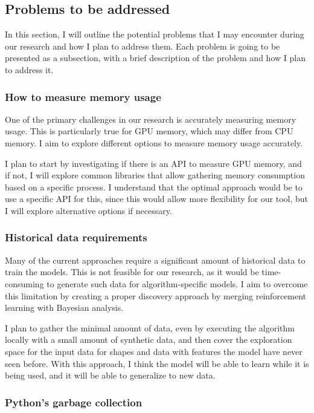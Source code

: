 \subsection{Problems to be addressed}
\label{subsec:problems-to-be-addressed}

In this section, I will outline the potential problems that I may encounter during our research and how I plan to address them.
Each problem is going to be presented as a subsection, with a brief description of the problem and how I plan to address it.

\subsubsection{How to measure memory usage}

One of the primary challenges in our research is accurately measuring memory usage.
This is particularly true for \ac{GPU} memory, which may differ from \ac{CPU} memory.
I aim to explore different options to measure memory usage accurately.

I plan to start by investigating if there is an API to measure \ac{GPU} memory, and if not, I will explore common libraries that allow gathering memory consumption based on a specific process.
I understand that the optimal approach would be to use a specific API for this, since this would allow more flexibility for our tool, but I will explore alternative options if necessary.

\subsubsection{Historical data requirements}

Many of the current approaches require a significant amount of historical data to train the models.
This is not feasible for our research, as it would be time-consuming to generate such data for algorithm-specific models.
I aim to overcome this limitation by creating a proper discovery approach by merging reinforcement learning with Bayesian analysis.

I plan to gather the minimal amount of data, even by executing the algorithm locally with a small amount of synthetic data, and then cover the exploration space for the input data for shapes and data with features the model have never seen before.
With this approach, I think the model will be able to learn while it is being used, and it will be able to generalize to new data.

\subsubsection{Python's garbage collection}


